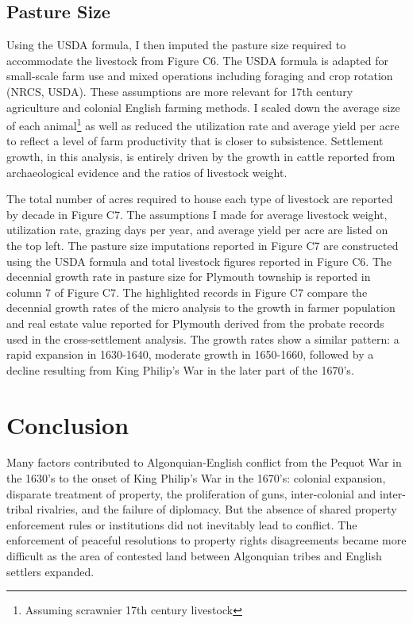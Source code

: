 \documentclass[sn-mathphys]{sn-jnl}%
\theoremstyle{thmstyleone}%
\theoremstyle{thmstyletwo}%
\theoremstyle{thmstylethree}%
\begin{document}
\subsection{Pasture Size}

Using the USDA formula, I then imputed the pasture size required to accommodate the livestock from Figure C6. The USDA formula is adapted for small-scale farm use and mixed operations including foraging and crop rotation (NRCS, USDA). These assumptions are more relevant for 17th century agriculture and colonial English farming methods. I scaled down the average size of each animal\footnote{Assuming scrawnier 17th century livestock} as well as reduced the utilization rate and average yield per acre to reflect a level of farm productivity that is closer to subsistence. Settlement growth, in this analysis, is entirely driven by the growth in cattle reported from archaeological evidence and the ratios of livestock weight.

The total number of acres required to house each type of livestock are reported by decade in Figure C7. The assumptions I made for average livestock weight, utilization rate, grazing days per year, and average yield per acre are listed on the top left. The pasture size imputations reported in Figure C7 are constructed using the USDA formula and total livestock figures reported in Figure C6. The decennial growth rate in pasture size for Plymouth township is reported in column 7 of Figure C7. The highlighted records in Figure C7 compare the decennial growth rates of the micro analysis to the growth in farmer population and real estate value reported for Plymouth derived from the probate records used in the cross-settlement analysis. The growth rates show a similar pattern:  a rapid expansion in 1630-1640, moderate growth in 1650-1660, followed by a decline resulting from King Philip's War in the later part of the 1670's.

\section{Conclusion}\label{sec13}

Many factors contributed to Algonquian-English conflict from the Pequot War in the 1630's to the onset of King Philip's War in the 1670's:  colonial expansion, disparate treatment of property, the proliferation of guns, inter-colonial and inter-tribal rivalries, and the failure of diplomacy. But the absence of shared property enforcement rules or institutions did not inevitably lead to conflict. The enforcement of peaceful resolutions to property rights disagreements became more difficult as the area of contested land between Algonquian tribes and English settlers expanded. %
\end{document}
